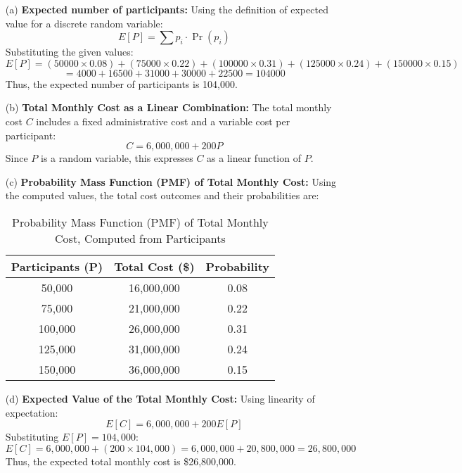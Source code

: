\documentclass{article}
\begin{document}
\begin{enumerate}

    \item[(a)] \textbf{Expected number of participants:}  
    Using the definition of expected value for a discrete random variable:
    \[
    E[P] = \sum p_i \cdot \Pr(p_i)
    \]
    Substituting the given values:
    \[
    E[P] = (50000 \times 0.08) + (75000 \times 0.22) + (100000 \times 0.31) + (125000 \times 0.24) + (150000 \times 0.15)
    \]
    \[
    = 4000 + 16500 + 31000 + 30000 + 22500 = 104000
    \]
    Thus, the expected number of participants is 104,000.

    \item[(b)] \textbf{Total Monthly Cost as a Linear Combination:}  
    The total monthly cost \( C \) includes a fixed administrative cost and a variable cost per participant:
    \[
    C = 6,000,000 + 200P
    \]
    Since \( P \) is a random variable, this expresses \( C \) as a linear function of \( P \).

    \item[(c)] \textbf{Probability Mass Function (PMF) of Total Monthly Cost:}  
    Using the computed values, the total cost outcomes and their probabilities are:

\begin{table}[H]
    \centering
    \begin{tabular}{c|c|c}
        \hline
        \textbf{Participants (P)} & \textbf{Total Cost (\$)} & \textbf{Probability} \\
        \hline
        50,000 & 16,000,000 & 0.08 \\
        75,000 & 21,000,000 & 0.22 \\
        100,000 & 26,000,000 & 0.31 \\
        125,000 & 31,000,000 & 0.24 \\
        150,000 & 36,000,000 & 0.15 \\
        \hline
    \end{tabular}
    \caption{Probability Mass Function (PMF) of Total Monthly Cost, Computed from Participants}
    \label{tab:pmf_total_cost}
\end{table}


    \item[(d)] \textbf{Expected Value of the Total Monthly Cost:}  
    Using linearity of expectation:
    \[
    E[C] = 6,000,000 + 200E[P]
    \]
    Substituting \( E[P] = 104,000 \):
    \[
    E[C] = 6,000,000 + (200 \times 104,000) = 6,000,000 + 20,800,000 = 26,800,000
    \]
    Thus, the expected total monthly cost is \$26,800,000.


\end{enumerate}
\end{document}
